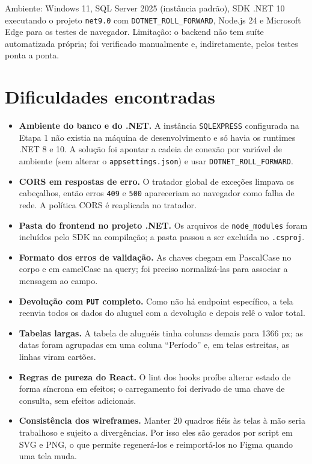 \documentclass[12pt]{article}
\begin{document}
Ambiente: Windows 11, SQL Server 2025 (instância padrão), SDK .NET 10 executando o projeto \texttt{net9.\allowbreak{}0} com \texttt{DOTNET\_\allowbreak{}ROLL\_\allowbreak{}FORWARD}, Node.js 24 e Microsoft Edge para os testes de navegador. Limitação: o backend não tem suíte automatizada própria; foi verificado manualmente e, indiretamente, pelos testes ponta a ponta.

\section{Dificuldades encontradas}

\begin{itemize}
  \item \textbf{Ambiente do banco e do .NET.} A instância \texttt{SQLEXPRESS} configurada na Etapa 1 não existia na máquina de desenvolvimento e só havia os runtimes .NET 8 e 10. A solução foi apontar a cadeia de conexão por variável de ambiente (sem alterar o \texttt{appsettings.\allowbreak{}json}) e usar \texttt{DOTNET\_\allowbreak{}ROLL\_\allowbreak{}FORWARD}.
  \item \textbf{CORS em respostas de erro.} O tratador global de exceções limpava os cabeçalhos, então erros \texttt{409} e \texttt{500} apareceriam ao navegador como falha de rede. A política CORS é reaplicada no tratador.
  \item \textbf{Pasta do frontend no projeto .NET.} Os arquivos de \texttt{node\_\allowbreak{}modules} foram incluídos pelo SDK na compilação; a pasta passou a ser excluída no \texttt{.\allowbreak{}csproj}.
  \item \textbf{Formato dos erros de validação.} As chaves chegam em PascalCase no corpo e em camelCase na query; foi preciso normalizá-las para associar a mensagem ao campo.
  \item \textbf{Devolução com \texttt{PUT} completo.} Como não há endpoint específico, a tela reenvia todos os dados do aluguel com a devolução e depois relê o valor total.
  \item \textbf{Tabelas largas.} A tabela de aluguéis tinha colunas demais para 1366 px; as datas foram agrupadas em uma coluna “Período” e, em telas estreitas, as linhas viram cartões.
  \item \textbf{Regras de pureza do React.} O lint dos hooks proíbe alterar estado de forma síncrona em efeitos; o carregamento foi derivado de uma chave de consulta, sem efeitos adicionais.
  \item \textbf{Consistência dos wireframes.} Manter 20 quadros fiéis às telas à mão seria trabalhoso e sujeito a divergências. Por isso eles são gerados por script em SVG e PNG, o que permite regenerá-los e reimportá-los no Figma quando uma tela muda.
\end{itemize}
\end{document}
